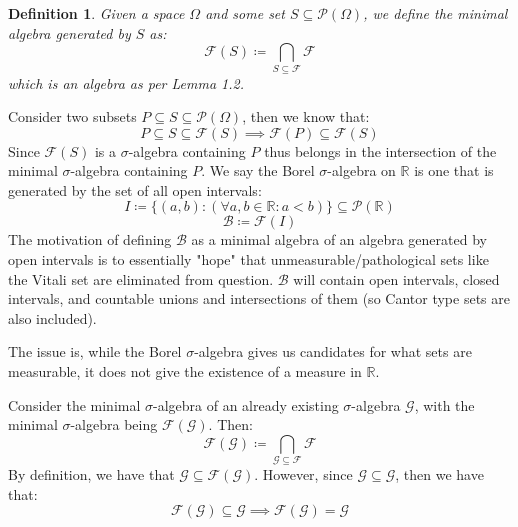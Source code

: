 \documentclass[10pt,letterpaper]{article} %
\newtheorem{defn}{Definition}[section]
\begin{document}
\begin{defn}
Given a space $\Omega$ and some set $S \subseteq \mathcal{P}(\Omega)$, we define the minimal algebra generated by $S$ as:
\begin{equation*}
\mathcal{F}(S) \coloneq \bigcap_{S \subseteq \mathcal{F}}\mathcal{F}
\end{equation*}
which is an algebra as per Lemma 1.2.
\end{defn}
Consider two subsets $P \subseteq S \subseteq \mathcal{P}(\Omega)$, then we know that:
\begin{equation*}
P \subseteq S \subseteq \mathcal{F}(S) \implies \mathcal{F}(P) \subseteq \mathcal{F}(S)
\end{equation*}
Since $\mathcal{F}(S)$ is a $\sigma$-algebra containing $P$ thus belongs in the intersection of the minimal $\sigma$-algebra containing $P$. We say the Borel $\sigma$-algebra on $\mathbb{R}$ is one that is generated by the set of all open intervals:
\begin{equation*}
I \coloneq \{(a, b): (\forall a, b \in \mathbb{R}: a < b)\} \subseteq \mathcal{P}(\mathbb{R})
\end{equation*}
\begin{equation*}
\mathcal{B} \coloneq \mathcal{F}(I)
\end{equation*}
The motivation of defining $\mathcal{B}$ as a minimal algebra of an algebra generated by open intervals is to essentially "hope" that unmeasurable/pathological sets like the Vitali set are eliminated from question. $\mathcal{B}$ will contain open intervals, closed intervals, and countable unions and intersections of them (so Cantor type sets are also included).

The issue is, while the Borel $\sigma$-algebra gives us candidates for what sets are measurable, it does not give the existence of a measure in $\mathbb{R}$.

Consider the minimal $\sigma$-algebra of an already existing $\sigma$-algebra $\mathcal{G}$, with the minimal $\sigma$-algebra being $\mathcal{F}(\mathcal{G})$. Then:
\begin{equation*}
\mathcal{F}(\mathcal{G}) \coloneq \bigcap_{\mathcal{G} \subseteq \mathcal{F}}\mathcal{F}
\end{equation*}
By definition, we have that $\mathcal{G} \subseteq \mathcal{F}(\mathcal{G})$. However, since $\mathcal{G} \subseteq \mathcal{G}$, then we have that:
\begin{equation*}
\mathcal{F}(\mathcal{G}) \subseteq \mathcal{G} \implies \mathcal{F}(\mathcal{G}) = \mathcal{G}
\end{equation*}
\end{document}

